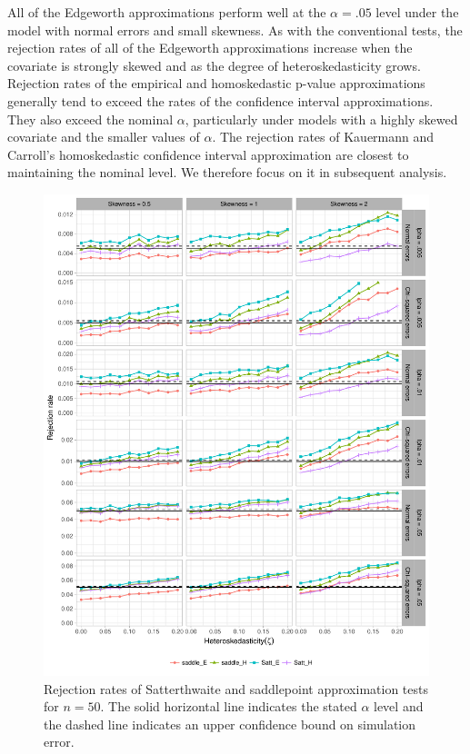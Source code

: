 \documentclass[12pt]{article}\usepackage[]{graphicx}\usepackage[]{color}
\newenvironment{knitrout}{}{} %
\begin{document}
All of the Edgeworth approximations perform well at the $\alpha = .05$ level under the model with normal errors and small skewness. As with the conventional tests, the rejection rates of all of the Edgeworth approximations increase when the covariate is strongly skewed and as the degree of heteroskedasticity grows. Rejection rates of the empirical and homoskedastic p-value approximations generally tend to exceed the rates of the confidence interval approximations. They also exceed the nominal $\alpha$, particularly under models with a highly skewed covariate and the smaller values of $\alpha$. The rejection rates of Kauermann and Carroll's homoskedastic confidence interval approximation are closest to maintaining the nominal level. We therefore focus on it in subsequent analysis. 

\begin{knitrout}
\color{fgcolor}\begin{figure}[p]

{\centering \includegraphics[width=\linewidth]{HC_fig/Satterthwaite_size-1} 

}

\caption[Rejection rates of Satterthwaite and saddlepoint approximation tests for $n = 50$]{Rejection rates of Satterthwaite and saddlepoint approximation tests for $n = 50$. The solid horizontal line indicates the stated $\alpha$ level and the dashed line indicates an upper confidence bound on simulation error.}\label{fig:Satterthwaite_size}
\end{figure}


\end{knitrout}
\end{document}

